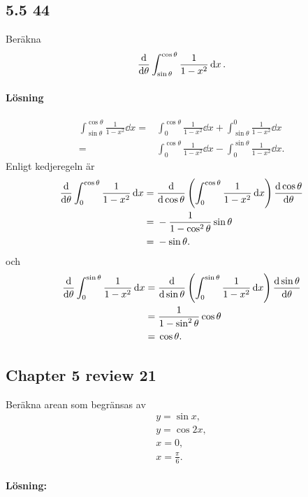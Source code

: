 \subsection{5.5 44}%
\label{sub:5_5_44}

Beräkna
\begin{align*}
	\derivative{}{\theta} \int_{\sin \theta}^{\cos \theta} \frac{1}{1 - x^2} \dd{x}.
\end{align*}

\paragraph{Lösning}

\begin{align*}
	\int_{\sin \theta}^{\cos \theta} \frac{1}{1 - x^2} \dd{x} ={}&
	\int_{0}^{\cos \theta} \frac{1}{1 - x^2} \dd{x}
	+ \int_{\sin \theta}^{0} \frac{1}{1 - x^2} \dd{x}\\
	={}& \int_{0}^{\cos \theta} \frac{1}{1 - x^2} \dd{x}
	- \int_{0}^{\sin \theta} \frac{1}{1 - x^2} \dd{x}.
\end{align*}
Enligt kedjeregeln är
\begin{align*}
	\derivative{}{\theta} \int_{0}^{\cos \theta} \frac{1}{1 - x^2} \dd{x} ={}&
	\derivative{}{\cos \theta} \left(\int_{0}^{\cos \theta} \frac{1}{1 - x^2} \dd{x}\right) \derivative{\cos \theta}{\theta}\\
	={}& -\frac{1}{1 - \cos^2 \theta} \sin \theta\\
	={}& -\sin \theta.
\end{align*}
och
\begin{align*}
	\derivative{}{\theta} \int_{0}^{\sin \theta} \frac{1}{1 - x^2} \dd{x} ={}&
	\derivative{}{\sin \theta} \left(\int_{0}^{\sin \theta} \frac{1}{1 - x^2} \dd{x}\right) \derivative{\sin \theta}{\theta}\\
	={}& \frac{1}{1 - \sin^2 \theta} \cos \theta\\
	={}& \cos \theta.
\end{align*}


\subsection{Chapter 5 review 21}%
\label{sub:chapter_5_review_21}

Beräkna arean som begränsas av
\begin{align*}
	y = \sin x,\\
	y = \cos 2 x,\\
	x = 0,\\
	x = \frac{\pi}{6}.
\end{align*}

\paragraph{Lösning:}


